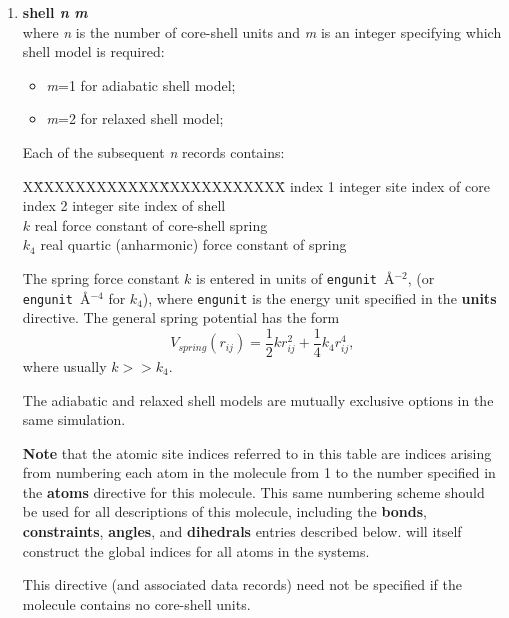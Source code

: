 \begin{enumerate}
\item{\bf shell {\em n} {\em m}}\\
where {\em n} is the number of core-shell units and {\em m} is an
integer specifying which shell model is required: 
\begin{itemize}
\item {\em m}=1 for adiabatic shell model;
\item {\em m}=2 for relaxed shell model;
\end{itemize}
Each of the subsequent {\em n} records contains:
\begin{tabbing}
X\=XXXXXXXXXXXX\=XXXXXXXXXXXX\=\kill
\> index 1 \> integer \> site index of core\\
\> index 2 \> integer \> site index of shell\\
\> $k$ \> real \> force constant of core-shell spring\\
\> $k_{4}$ \> real \> quartic (anharmonic) force constant of spring\\
\end{tabbing}
The spring force constant $k$ is entered in units of {\tt engunit}~\AA$^{-2}$, 
(or {\tt engunit}~\AA$^{-4}$ for $k_{4}$),
where {\tt engunit} is the energy unit specified in the {\bf units} 
directive. The general spring potential has the form 
\[V_{spring}(r_{ij})=\frac{1}{2}k r_{ij}^{2}+\frac{1}{4}k_{4} r_{ij}^{4},\]
where usually $k >> k_{4}$.

The adiabatic and relaxed shell models are mutually
exclusive options in the same simulation.

{\bf Note} that the atomic site indices referred to in this table are
indices arising from numbering each atom in the molecule from 1 to the
number specified in the {\bf atoms} directive for this molecule. This
same numbering scheme should be used for all descriptions of this
molecule, including the {\bf bonds}, {\bf constraints}, {\bf angles},
and {\bf dihedrals} entries described below. \D{} will itself construct
the global indices for all atoms in the systems.

This directive (and associated data records) need not be specified if
the molecule contains no core-shell units.


\end{enumerate}
